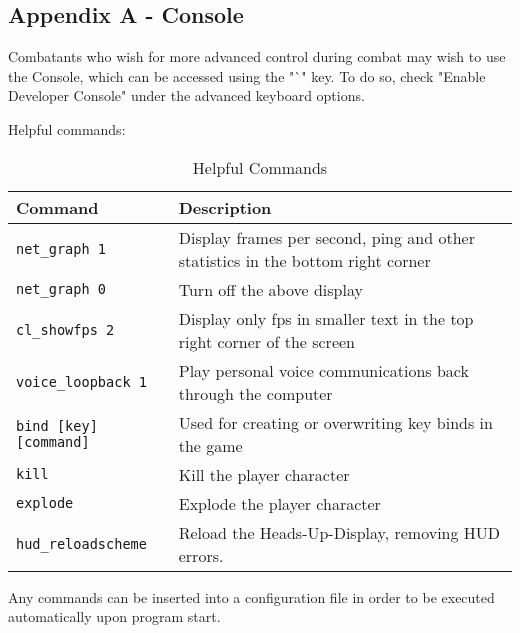 \subsection{Appendix A - Console}
\label{Appendix_A_Console}
Combatants who wish for more advanced control during combat may wish to use the Console, which can be accessed using the "`" key. To do so, check "Enable Developer Console" under the advanced keyboard options.

Helpful commands:
\begin{table}[h!b!p!]
\caption{Helpful Commands}
\begin{tabular}{|l|p{10.5cm}|}
	\hline
		Command & Description\\
	\hline
	\texttt{net\_graph 1}&Display frames per second, ping and other statistics in the bottom right corner\\
	\texttt{net\_graph 0}&Turn off the above display\\
	\texttt{cl\_showfps 2}&Display only fps in smaller text in the top right corner of the screen\\
	\texttt{voice\_loopback 1}&Play personal voice communications back through the computer\\
	\texttt{bind [key] [command]}&Used for creating or overwriting key binds in the game\\
	\texttt{kill}&Kill the player character\\
	\texttt{explode}&Explode the player character\\
	\texttt{hud\_reloadscheme}&Reload the Heads-Up-Display, removing HUD errors.\\
  	\hline
\end{tabular}
\label{table_common_actions}
\end{table}


Any commands can be inserted into a configuration file in order to be executed automatically upon program start.